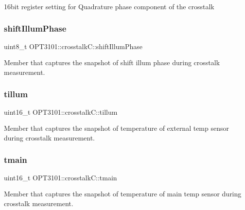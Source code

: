 16bit register setting for Quadrature phase component of the crosstalk 

\mbox{\label{class_o_p_t3101_1_1crosstalk_c_ae60d9239aa603895c534e954ee87c613}} 
\subsubsection{\texorpdfstring{shift\+Illum\+Phase}{shiftIllumPhase}}
{\footnotesize\ttfamily uint8\+\_\+t O\+P\+T3101\+::crosstalk\+C\+::shift\+Illum\+Phase}



Member that captures the snapshot of shift illum phase during crosstalk measurement. 

\mbox{\label{class_o_p_t3101_1_1crosstalk_c_ab1d1d581f0495f5695ad49a2a8a41fd3}} 
\subsubsection{\texorpdfstring{tillum}{tillum}}
{\footnotesize\ttfamily uint16\+\_\+t O\+P\+T3101\+::crosstalk\+C\+::tillum}



Member that captures the snapshot of temperature of external temp sensor during crosstalk measurement. 

\mbox{\label{class_o_p_t3101_1_1crosstalk_c_a8b7250b531e953587c665c2c43860d82}} 
\subsubsection{\texorpdfstring{tmain}{tmain}}
{\footnotesize\ttfamily uint16\+\_\+t O\+P\+T3101\+::crosstalk\+C\+::tmain}



Member that captures the snapshot of temperature of main temp sensor during crosstalk measurement. 

